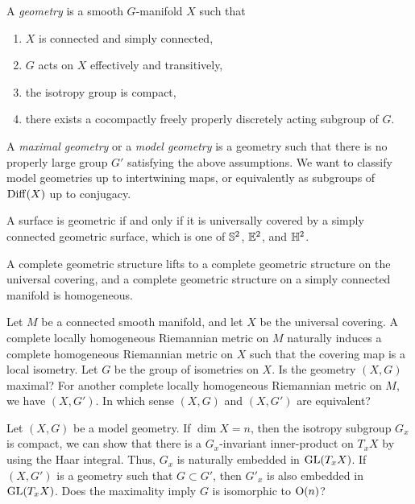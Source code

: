 \documentclass{../../large}
\begin{document}
\begin{prb}
A \emph{geometry} is a smooth $G$-manifold $X$ such that
\begin{enumerate}
\item $X$ is connected and simply connected,
\item $G$ acts on $X$ effectively and transitively,
\item the isotropy group is compact,
\item there exists a cocompactly freely properly discretely acting subgroup of $G$.
\end{enumerate}
A \emph{maximal geometry} or a \emph{model geometry} is a geometry such that there is no properly large group $G'$ satisfying the above assumptions.
We want to classify model geometries up to intertwining maps, or equivalently as subgroups of $\Diff(X)$ up to conjugacy.


\begin{parts}
\item
\item A surface is geometric if and only if it is universally covered by a simply connected geometric surface, which is one of $\S^2$, $\E^2$, and $\H^2$.
\item A complete geometric structure lifts to a complete geometric structure on the universal covering, and a complete geometric structure on a simply connected manifold is homogeneous.
\end{parts}
\end{prb}
\begin{pf}
Let $M$ be a connected smooth manifold, and let $X$ be the universal covering.
A complete locally homogeneous Riemannian metric on $M$ naturally induces a complete homogeneous Riemannian metric on $X$ such that the covering map is a local isometry.
Let $G$ be the group of isometries on $X$.
Is the geometry $(X,G)$ maximal?
For another complete locally homogeneous Riemannian metric on $M$, we have $(X,G')$.
In which sense $(X,G)$ and $(X,G')$ are equivalent?


Let $(X,G)$ be a model geometry.
If $\dim X=n$, then the isotropy subgroup $G_x$ is compact, we can show that there is a $G_x$-invariant inner-product on $T_xX$ by using the Haar integral.
Thus, $G_x$ is naturally embedded in $\GL(T_xX)$.
If $(X,G')$ is a geometry such that $G\subset G'$, then $G'_x$ is also embedded in $\GL(T_xX)$.
Does the maximality imply $G$ is isomorphic to $\rO(n)$?



\end{pf}
\end{document}
